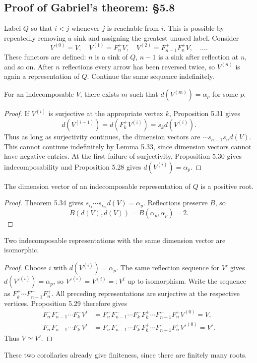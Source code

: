\subsection*{Proof of Gabriel's theorem: §5.8}
Label $Q$ so that $i<j$ whenever $j$ is reachable from $i$. This is possible by repeatedly removing a sink and assigning the greatest unused label. Consider
\[
V^{(0)}=V,\quad V^{(1)}=F_n^+V,\quad
V^{(2)}=F_{n-1}^+F_n^+V,\quad\ldots.
\]
These functors are defined: $n$ is a sink of $Q$, $n-1$ is a sink after reflection at $n$, and so on. After $n$ reflections every arrow has been reversed twice, so $V^{(n)}$ is again a representation of $Q$. Continue the same sequence indefinitely.

\begin{theorem}[Theorem 5.34]
For an indecomposable $V$, there exists $m$ such that $d(V^{(m)})=\alpha_p$ for some $p$.
\end{theorem}
\begin{proof}
If $V^{(i)}$ is surjective at the appropriate vertex $k$, Proposition 5.31 gives
\[
d(V^{(i+1)})=d(F_k^+V^{(i)})=s_k d(V^{(i)}).
\]
Thus as long as surjectivity continues, the dimension vectors are $\cdots s_{n-1}s_nd(V)$. This cannot continue indefinitely by Lemma 5.33, since dimension vectors cannot have negative entries. At the first failure of surjectivity, Proposition 5.30 gives indecomposability and Proposition 5.28 gives $d(V^{(i)})=\alpha_p$.
\end{proof}

\begin{corollary}[Corollary 5.35]
The dimension vector of an indecomposable representation of $Q$ is a positive root.
\end{corollary}
\begin{proof}
Theorem 5.34 gives $s_{i_1}\cdots s_{i_m}d(V)=\alpha_p$. Reflections preserve $B$, so
\[
B(d(V),d(V))=B(\alpha_p,\alpha_p)=2.
\]
\end{proof}

\begin{corollary}[Corollary 5.36]
Two indecomposable representations with the same dimension vector are isomorphic.
\end{corollary}
\begin{proof}
Choose $i$ with $d(V^{(i)})=\alpha_p$. The same reflection sequence for $V'$ gives $d(V'^{(i)})=\alpha_p$, so $V'^{(i)}=V^{(i)}=:V^i$ up to isomorphism. Write the sequence as $F_k^+\cdots F_{n-1}^+F_n^+$. All preceding representations are surjective at the respective vertices. Proposition 5.29 therefore gives
\[
\begin{aligned}
F_n^-F_{n-1}^-\cdots F_k^-V^i
&=F_n^-F_{n-1}^-\cdots F_k^-F_k^+\cdots F_{n-1}^+F_n^+V^{(0)}=V,\\
F_n^-F_{n-1}^-\cdots F_k^-V^i
&=F_n^-F_{n-1}^-\cdots F_k^-F_k^+\cdots F_{n-1}^+F_n^+V'^{(0)}=V'.
\end{aligned}
\]
Thus $V\simeq V'$.
\end{proof}
These two corollaries already give finiteness, since there are finitely many roots.

